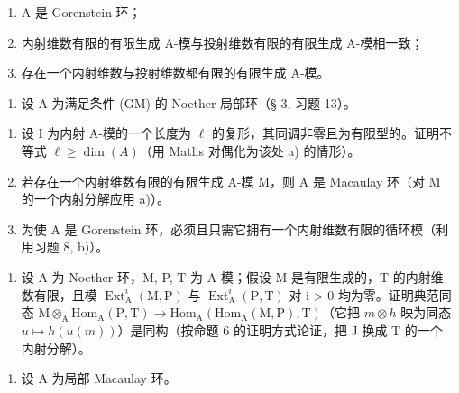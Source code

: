 \begin{enumerate}
\def\labelenumi{(\roman{enumi})}
\item
  A 是 Gorenstein 环；
\item
  内射维数有限的有限生成 A-模与投射维数有限的有限生成 A-模相一致；
\item
  存在一个内射维数与投射维数都有限的有限生成 A-模。
\end{enumerate}

\begin{enumerate}
\def\labelenumi{\arabic{enumi})}
\setcounter{enumi}{8}
\tightlist
\item
  设 A 为满足条件 (GM) 的 Noether 局部环（§ 3, 习题 13）。
\end{enumerate}

\begin{enumerate}
\def\labelenumi{\alph{enumi})}
\item
  设 I 为内射 A-模的一个长度为 \(\ell\) 的复形，其同调非零且为有限型的。证明不等式 \(\ell \geqslant \dim(A)\)（用 Matlis 对偶化为该处 a) 的情形）。
\item
  若存在一个内射维数有限的有限生成 A-模 M，则 A 是 Macaulay 环（对 M 的一个内射分解应用 a)）。
\item
  为使 A 是 Gorenstein 环，必须且只需它拥有一个内射维数有限的循环模（利用习题 8, b)）。
\end{enumerate}

\begin{enumerate}
\def\labelenumi{\arabic{enumi})}
\setcounter{enumi}{9}
\tightlist
\item
  设 A 为 Noether 环，M, P, T 为 A-模；假设 M 是有限生成的，T 的内射维数有限，且模 \(\operatorname{Ext}_{\mathrm{A}}^{i}(\mathrm{M},\mathrm{P})\) 与 \(\operatorname{Ext}_{\mathrm{A}}^{i}(\mathrm{P},\mathrm{T})\) 对 i \textgreater{} 0 均为零。证明典范同态 \(\mathrm{M}\otimes_{\mathrm{A}}\mathrm{Hom}_{\mathrm{A}}(\mathrm{P},\mathrm{T})\to\mathrm{Hom}_{\mathrm{A}}(\mathrm{Hom}_{\mathrm{A}}(\mathrm{M},\mathrm{P}),\mathrm{T})\)（它把 \(m\otimes h\) 映为同态 \(u\mapsto h(u(m))\)）是同构（按命题 6 的证明方式论证，把 J 换成 T 的一个内射分解）。
\end{enumerate}


\begin{enumerate}
\def\labelenumi{\arabic{enumi})}
\tightlist
\item
  设 A 为局部 Macaulay 环。
\end{enumerate}


